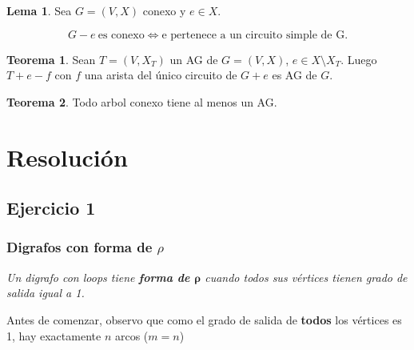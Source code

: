 \documentclass[12pt, a4paper]{report}
\theoremstyle{definition} %
\newtheorem{theorem}{Teorema}
\newtheorem{lemma}{Lema}
\begin{document}
\begin{lemma}\label{lema:tree-g-e}
    Sea $G = (V, X)$ conexo y $e \in X$.

    \[ G - e \ \text{es conexo} \iff \text{e pertenece a un circuito simple de G.} \]
\end{lemma}

\begin{theorem}\label{teo:tree-t-e-f}
    Sean $T = (V, X_T)$ un AG de $G = (V, X)$, $e \in X \setminus X_T$. Luego $T + e - f$ con $f$ una arista del único circuito de $G+e$ es AG de $G$.
\end{theorem}

\begin{theorem}\label{teo:tree/AG}
    Todo arbol conexo tiene al menos un AG.
\end{theorem}

\chapter*{Resolución}

\section*{Ejercicio 1}

\subsection*{Digrafos con forma de $\rho$}
\textit{Un digrafo con loops tiene \textbf{forma de $\bm{\rho}$} cuando todos sus vértices tienen grado de salida igual a 1.}

Antes de comenzar, observo que como el grado de salida de \textbf{todos} los vértices es 1, hay exactamente $n$ arcos ($m = n$)
\end{document}
